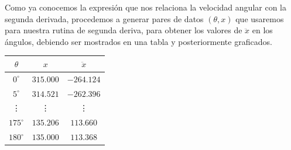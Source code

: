 \begin{frame}
Como ya conocemos la expresión que nos relaciona la velocidad angular con la segunda derivada, procedemos a generar pares de datos $(\theta,x)$ que usaremos para nuestra rutina de segunda deriva, para obtener los valores de $\ddot{x}$ en los ángulos, debiendo ser mostrados en una tabla y posteriormente graficados.
\\
\medskip
\begin{center}
\begin{tabular}{c | c | c}
$\theta$ & $x$  &  $\ddot{x}$ \\ \hline
$0^{\circ}$      & $315.000$ & $-264.124$ \\ \hline
$5^{\circ}$ 	 & $314.521$ & $-262.396$ \\ \hline
\vdots   & \vdots    & \vdots    \\ \hline
$175^{\circ}$    & $135.206$ & $113.660$ \\ \hline
$180^{\circ}$    & $135.000$ & $113.368$
\end{tabular}
\end{center}
\end{frame}
